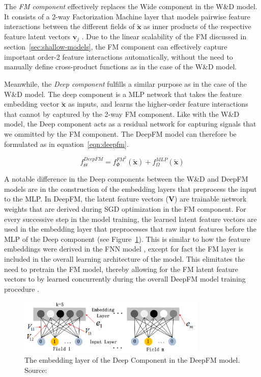 \documentclass{mldsmsc}
\begin{document}
The \emph{FM component} effectively replaces the Wide component in the W\&D model. It consists
of a 2-way Factorization Machine layer that models pairwise feature interactions between the
different fields of $\tilde{\mathbf{x}}$ as inner products of the respective feature latent
vectors $\mathbf{v}_j$ \citep{RefWorks:guo2017deepfm:}. Due to the linear scalability of
the FM discussed in section~\ref{sec:shallow-models}, the FM component can effectively
capture important order-2 feature interactions automatically, without the need to manually
define cross-product functions as in the case of the W\&D model.

Meanwhile, the \emph{Deep component} fulfills a similar purpose as in the case of the W\&D
model. The deep component is a MLP network that takes the feature embedding vector $\tilde{\mathbf{x}}$
as inputs, and learns the higher-order feature interactions that cannot by captured by the
2-way FM component. Like with the W\&D model, the Deep component acts as a residual network
for capturing signals that we ommitted by the FM component. The DeepFM model can therefore
be formulated as in equation~\ref{eqn:deepfm}.

\begin{equation}\label{eqn:deepfm}
    f_{\Theta}^{DeepFM} = f_{\Phi}^{FM^2}(\tilde{\mathbf{x}}) + f_{\Omega}^{MLP}(\tilde{\mathbf{x}})
\end{equation}

A notable difference
in the Deep components between the W\&D and DeepFM models are in the construction of the
embedding layers that preprocess the input to the MLP. In DeepFM, the latent feature vectors
($\mathbf{V}$) are trainable network weights that are derived during SGD optimization in the FM
component. For every successive step in the model training, the learned latent feature vectors
are used in the embedding layer that preprocesses that raw input features before the MLP of 
the Deep component (see Figure~\ref{fig:deepfm-embedding}). This is similar to how the feature embeddings were derived in the FNN model
\citep{RefWorks:zhang2016deep}, except for fact the FM layer is included in the overall learning
architecture of the model. This elimitates the need to pretrain the FM model, thereby allowing
for the FM latent feature vectors to by learned concurrently during the overall DeepFM model
training procedure \citep{RefWorks:guo2017deepfm:}.

\begin{figure}[h]
    \centering
    \includegraphics[width=0.8\textwidth]{../figures/deepfm_embedding.png}
    \caption{The embedding layer of the Deep Component in the DeepFM model. Source: \citep{RefWorks:guo2017deepfm:}}
    \label{fig:deepfm-embedding}
\end{figure}
\end{document}
